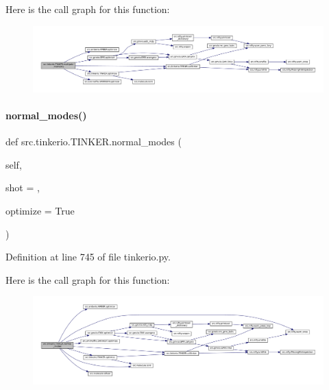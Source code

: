 Here is the call graph for this function\+:
\nopagebreak
\begin{figure}[H]
\begin{center}
\leavevmode
\includegraphics[width=350pt]{classsrc_1_1tinkerio_1_1TINKER_aef7b87a4751dbf7365e0615a6c9f15ee_cgraph}
\end{center}
\end{figure}
\mbox{\label{classsrc_1_1tinkerio_1_1TINKER_a6b6cbb8118a36e0537210de0d9e91122}} 
\paragraph{\texorpdfstring{normal\+\_\+modes()}{normal\_modes()}}
{\footnotesize\ttfamily def src.\+tinkerio.\+T\+I\+N\+K\+E\+R.\+normal\+\_\+modes (\begin{DoxyParamCaption}\item[{}]{self,  }\item[{}]{shot = {},  }\item[{}]{optimize = {\ttfamily True} }\end{DoxyParamCaption})}



Definition at line 745 of file tinkerio.\+py.

Here is the call graph for this function\+:
\nopagebreak
\begin{figure}[H]
\begin{center}
\leavevmode
\includegraphics[width=350pt]{classsrc_1_1tinkerio_1_1TINKER_a6b6cbb8118a36e0537210de0d9e91122_cgraph}
\end{center}
\end{figure}
\mbox{\label{classsrc_1_1tinkerio_1_1TINKER_a925601bd948f7a34dd0a229da9b16f0a}} 
